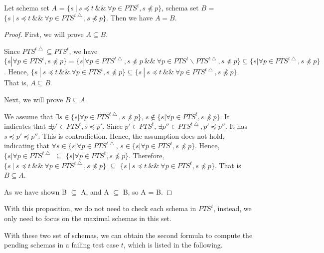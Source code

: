 \begin{proposition}\label{pro:healthysintequal2}
Let schema set $A$ = $\{ s\ |\ s \preceq t\ \&\&\ \forall p \in PTS^{t}, s \npreceq p \}$, schema set $B$ = $\{ s\ |\ s \preceq t\ \&\&\ \forall p \in PTS^{t\bigtriangleup}, s \npreceq p \}$. Then we have $A = B$.
\end{proposition}

\begin{proof}

First, we will prove $A \subseteq B$.

Since $PTS^{t\bigtriangleup} \subseteq PTS^{t}$, we have $  \{ s | \forall p \in PTS^{t}, s \npreceq p \} =  \{ s | \forall p \in PTS^{t\bigtriangleup}, s \npreceq p \ \&\& \  \forall p \in PTS^{t} \backslash PTS^{t\bigtriangleup}, s \npreceq p \} \subseteq \{ s | \forall p \in PTS^{t\bigtriangleup}, s \npreceq p \}$. Hence,  $\{ s\ |\ s \preceq t\ \&\&\ \forall p \in PTS^{t}, s \npreceq p \} \subseteq  \{ s\ |\ s \preceq t\ \&\&\ \forall p \in PTS^{t\bigtriangleup}, s \npreceq p \}$. That is,  $A \subseteq B$.

Next, we will prove $B \subseteq A$.

We assume that  $\exists s \in  \{ s | \forall p \in PTS^{t\bigtriangleup}, s \npreceq p \}$, $ s \notin \{ s | \forall p \in PTS^{t}, s \npreceq p \}$. It indicates that $\exists p' \in PTS^{t}, s \preceq p'$. Since $p' \in PTS^{t}$, $\exists p'' \in PTS^{t\bigtriangleup}, p' \preceq p''$. It has $s \preceq p' \preceq p''$. This is contradiction.  Hence, the assumption does not hold, indicating that $\forall s \in  \{ s | \forall p \in PTS^{t\bigtriangleup}$, $s \in  \{ s | \forall p \in PTS^{t}, s \npreceq p \}$. Hence, $\{ s | \forall p \in PTS^{t\bigtriangleup}$ $\subseteq$ $\{ s | \forall p \in PTS^{t}, s \npreceq p \}$. Therefore, $\{ s\ |\ s \preceq t\ \&\&\ \forall p \in PTS^{t\bigtriangleup}, s \npreceq p \}$ $\subseteq$ $\{ s\ |\ s \preceq t\ \&\&\ \forall p \in PTS^{t}, s \npreceq p \} $. That is $B \subseteq A$.

As we have shown B $\subseteq$ A, and A $\subseteq$ B, so A = B.
\end{proof}

With this proposition, we do not need to check each schema in $PTS^{t}$, instead, we only need to focus on the maximal schemas in this set.

With these two set of schemas, we can obtain the second formula to compute the pending schemas in a failing test case $t$, which is listed in the following.

